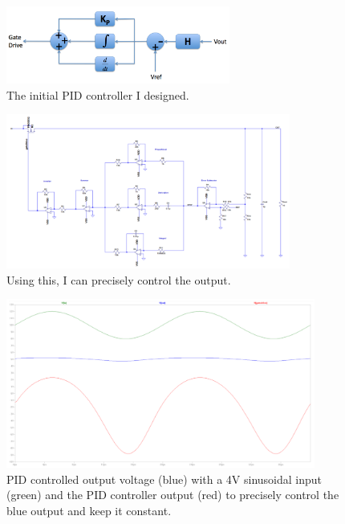 \documentclass[10pt]{amsart}
\begin{document}
\begin{figure}[h]
	\begin{center}
		\includegraphics[height=1in]{Media/PID.png}
	\end{center}
	\caption{The initial PID controller I designed.}
	\label{fig:piedmont}
\end{figure}

\begin{figure}[h]
	\begin{center}
		\includegraphics[height=2in]{Media/PID_sc.png}
	\end{center}
	\caption{Using this, I can precisely control the output.}
	\label{fig:pid}
\end{figure}

\begin{figure}[h]
	\begin{center}
		\includegraphics[width=4in]{Media/pidfb.png}
	\end{center}
	\caption{PID controlled output voltage (blue) with a 4V sinusoidal input (green) and the PID controller output (red) to precisely control the blue output and keep it constant.}
	\label{fig:pidfb}
\end{figure}
\end{document}
